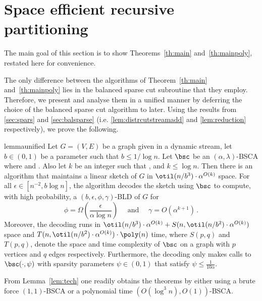 \section{Space efficient recursive partitioning}
\label{sec:algexpdec}

\noindent
The main goal of this section is to show Theorems~\ref{th:main} and~\ref{th:mainpoly}, restated here for convenience.

\mainbld*
\mainbldpoly*
\noindent
The only difference between the algorithms of Theorem~\ref{th:main} and~\ref{th:mainpoly} lies in the balanced sparse cut subroutine that they employ. Therefore, we present and analyse them in a unified manner by deferring the choice of the balanced sparse cut algorithm to later. Using the results from \cref{sec:spars} and \cref{sec:balsparse} (i.e. \cref{lem:distrcutstreamadd} and \cref{lem:reduction} respectively), we prove the following.


\begin{restatable}{lemma}{unified}
	\label{lem:tech}
	Let $G=(V,E)$ be a graph given in a dynamic stream, let $b \in (0,1)$ be a parameter such that $b \le {1}/{\log n}$. Let $\bsc$ be an $(\alpha,\lambda)$-BSCA where  and . Also let $k$ be an integer such that , and $k \le \log n$. Then there is an algorithm that maintains a linear sketch of $G$ in $\otil( n/b^3) \cdot \alpha^{O(k)}$ space. For all $\epsilon \in [n^{-2},b\log n]$, the algorithm decodes the sketch using $\bsc$ to compute, with high probability, a $(b,\epsilon,\phi,\gamma)$-BLD of $G$ for
	\begin{equation*}
		\phi = \Omega\left(\frac{\epsilon}{\alpha \log n}\right) \quad \text{ and } \quad \gamma = O(\alpha^{k+1}) \, .
	\end{equation*}
	Moreover, the decoding runs in $\otil( n/b^3) \cdot \alpha^{O(k)}+S(n,\otil( n/b^2) \cdot \alpha^{O(k)})$ space and  {$T(n,\otil( n/b^2) \cdot \alpha^{O(k)}) \cdot \poly(n) $} time, where $S(p,q)$ and $T(p,q)$, denote the space and time complexity of $\bsc$ on a graph with $p$ vertices and $q$ edges respectively. Furthermore, the decoding only makes calls to $\bsc(\cdot, \psi)$ with sparsity parameters $\psi \in (0,1)$ that satisfy $\psi \le \frac{1}{10\alpha}$.
\end{restatable}

\noindent
From Lemma~\ref{lem:tech} one readily obtains the theorems by either using a brute force $(1,1)$-BSCA or a polynomial time $(O(\log^3 n), O(1))$-BSCA.

